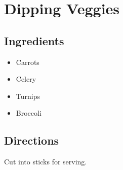 \section{Dipping Veggies}

\subsection{ Ingredients }

\begin{itemize}
  \item <3 oz> Carrots
  \item <3 oz> Celery
  \item <3 oz> Turnips
  \item <3 oz> Broccoli
\end{itemize}

\subsection{ Directions }

Cut into sticks for serving. 

